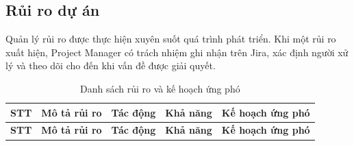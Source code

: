 \subsection{Rủi ro dự án}

Quản lý rủi ro được thực hiện xuyên suốt quá trình phát triển. Khi một rủi ro xuất hiện, Project Manager có trách nhiệm ghi nhận trên Jira, xác định người xử lý và theo dõi cho đến khi vấn đề được giải quyết.

\begin{longtable}{|p{0.8cm}|p{5.2cm}|p{1.8cm}|p{1.8cm}|p{5.0cm}|}
    \caption{Danh sách rủi ro và kế hoạch ứng phó}
    \label{tab:project-risks}\\
    \hline
    \textbf{STT} & \textbf{Mô tả rủi ro} & \textbf{Tác động} & \textbf{Khả năng} & \textbf{Kế hoạch ứng phó} \\
    \hline
    \endfirsthead

    \hline
    \textbf{STT} & \textbf{Mô tả rủi ro} & \textbf{Tác động} & \textbf{Khả năng} & \textbf{Kế hoạch ứng phó} \\
    \hline
    \endhead


\end{longtable}
